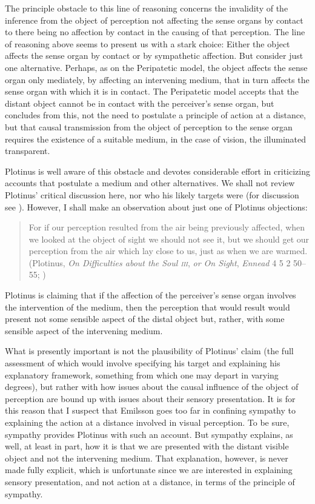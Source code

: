 The principle obstacle to this line of reasoning concerns the invalidity of the inference from the object of perception not affecting the sense organs by contact to there being no affection by contact in the causing of that perception. The line of reasoning above seems to present us with a stark choice: Either the object affects the sense organ by contact or by sympathetic affection. But consider just one alternative. Perhaps, as on the Peripatetic model, the object affects the sense organ only mediately, by affecting an intervening medium, that in turn affects the sense organ with which it is in contact. The Peripatetic model accepts that the distant object cannot be in contact with the perceiver's sense organ, but concludes from this, not the need to postulate a principle of action at a distance, but that causal transmission from the object of perception to the sense organ requires the existence of a suitable medium, in the case of vision, the illuminated transparent.

Plotinus is well aware of this obstacle and devotes considerable effort in criticizing accounts that postulate a medium and other alternatives. We shall not review Plotinus' critical discussion here, nor who his likely targets were (for discussion see \citealt[chapter 3.1]{Emilsson:1988uq}). However, I shall make an observation about just one of Plotinus objections:
\begin{quote}
	For if our perception resulted from the air being previously affected, when we looked at the object of sight we should not see it, but we should get our perception from the air which lay close to us, just as when we are warmed. (Plotinus, \emph{On Difficulties about the Soul \textsc{iii}}, \emph{or On Sight}, \emph{Ennead} 4 5 2 50--55; \citealt[289]{Armstrong:1984aa})
\end{quote}
Plotinus is claiming that if the affection of the perceiver's sense organ involves the intervention of the medium, then the perception that would result would present not some sensible aspect of the distal object but, rather, with some sensible aspect of the intervening medium. 

What is presently important is not the plausibility of Plotinus' claim (the full assessment of which would involve specifying his target and explaining his explanatory framework, something from which one may depart in varying degrees), but rather with how issues about the causal influence of the object of perception are bound up with issues about their sensory presentation. It is for this reason that I suspect that Emilsson goes too far in confining sympathy to explaining the action at a distance involved in visual perception. To be sure, sympathy provides Plotinus with such an account. But sympathy explains, as well, at least in part, how it is that we are presented with the distant visible object and not the intervening medium. That explanation, however, is never made fully explicit, which is unfortunate since we are interested in explaining sensory presentation, and not action at a distance, in terms of the principle of sympathy.

